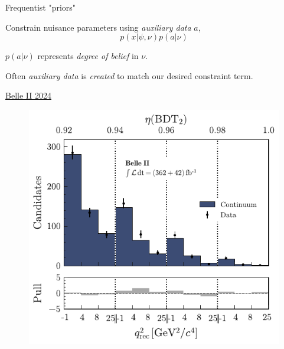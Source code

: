 \documentclass[
aspectratio=169,
14pt,
professionalfonts
]{beamer}
\begin{document}
\begin{frame}{Frequentist "priors"}
    \vspace{-0.5cm}
    \begin{minipage}{0.7\textwidth}
        Constrain nuisance parameters using \textit{auxiliary data} $a$,
        $$p(x| \psi, \nu) p(a| \nu)$$
        
        $p(a| \nu)$ represents \textit{degree of belief} in $\nu$.
        
        \vspace{0.5cm}
        
        Often \textit{auxiliary data} is \textit{created} to match our desired constraint term.

        \flushright \small
        \href{https://arxiv.org/pdf/2311.14647}{Belle II 2024}
    \end{minipage}
    \begin{minipage}{0.29\textwidth}
        \begin{figure}
            \centering
            \includegraphics[width=\textwidth]{../plots/knunu-offres.pdf}

\end{figure}
\end{minipage}
\end{frame}
\end{document}
